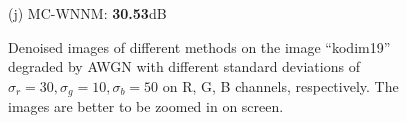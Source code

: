 \documentclass[10pt,onecolumn,letterpaper]{article}
\begin{document}
\begin{figure}[!htbp]
{\begin{minipage}[t]{0.25\textwidth}
{\footnotesize (j) MC-WNNM: \textbf{30.53}dB}
\end{minipage}
}
\caption{Denoised images of different methods on the image ``kodim19'' degraded by AWGN with different standard deviations of $\sigma_{r}=30, \sigma_{g}=10, \sigma_{b}=50$ on R, G, B channels, respectively. The images are better to be zoomed in on screen.}
\label{f4}
\end{figure}



\begin{figure}[!htbp]
\centering
{}
\end{figure}
\end{document}

